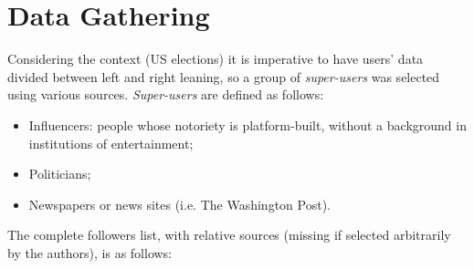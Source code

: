 \section{Data Gathering}

Considering the context (US elections) it is imperative to have users' data divided between left and right leaning, so a group of \textit{super-users} was selected using various sources. 
\textit{Super-users} are defined as follows:

\begin{itemize}
    \item Influencers: people whose notoriety is platform-built, without a background in institutions of entertainment;
    \item Politicians;
    \item Newspapers or news sites (i.e. The Washington Post).
\end{itemize}

The complete followers list, with relative sources (missing if selected arbitrarily by the authors), is as follows:

